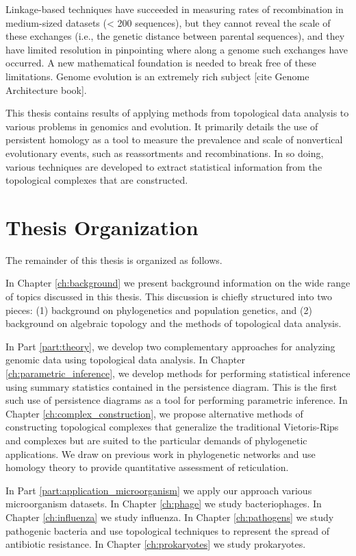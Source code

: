Linkage-based techniques have succeeded in measuring rates of recombination in medium-sized datasets (< 200 sequences), but they cannot reveal the scale of these exchanges (i.e., the genetic distance between parental sequences), and they have limited resolution in pinpointing where along a genome such exchanges have occurred.
A new mathematical foundation is needed to break free of these limitations.
Genome evolution is an extremely rich subject [cite Genome Architecture book].

This thesis contains results of applying methods from topological data analysis to various problems in genomics and evolution.
It primarily details the use of persistent homology as a tool to measure the prevalence and scale of nonvertical evolutionary events, such as reassortments and recombinations.
In so doing, various techniques are developed to extract statistical information from the topological complexes that are constructed.

\section{Thesis Organization}

The remainder of this thesis is organized as follows.

In Chapter \ref{ch:background} we present background information on the wide range of topics discussed in this thesis.
This discussion is chiefly structured into two pieces: (1) background on phylogenetics and population genetics, and (2) background on algebraic topology and the methods of topological data analysis.

In Part \ref{part:theory}, we develop two complementary approaches for analyzing genomic data using topological data analysis.
In Chapter \ref{ch:parametric_inference}, we develop methods for performing statistical inference using summary statistics contained in the persistence diagram.
This is the first such use of persistence diagrams as a tool for performing parametric inference.
In Chapter \ref{ch:complex_construction}, we propose alternative methods of constructing topological complexes that generalize the traditional Vietoris-Rips and \Cech complexes but are suited to the particular demands of phylogenetic applications.
We draw on previous work in phylogenetic networks and use homology theory to provide quantitative assessment of reticulation.

In Part \ref{part:application_microorganism} we apply our approach various microorganism datasets.
In Chapter \ref{ch:phage} we study bacteriophages.
In Chapter \ref{ch:influenza} we study influenza.
In Chapter \ref{ch:pathogens} we study pathogenic bacteria and use topological techniques to represent the spread of antibiotic resistance.
In Chapter \ref{ch:prokaryotes} we study prokaryotes.


